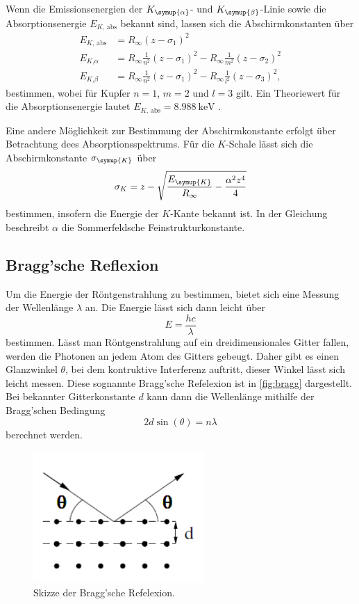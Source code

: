 Wenn die Emissionsenergien der $K_{\symup{\alpha}}$- und $K_{\symup{\beta}}$-Linie sowie die Absorptionsenergie
$E_{K\text{, abs}}$ bekannt sind, lassen sich die Abschirmkonstanten über
\begin{align}
    \label{eq:Sigma_Kupfer}
    E_{K \text{, abs}} &= R_\infty (z - \sigma_1)^2 \\
    \label{eq:Sigma_Kupfer2}
    E_{K \text{,} \alpha} &= R_\infty \frac{1}{n^2} (z - \sigma_1)^2 - R_\infty \frac{1}{m^2} (z - \sigma_2)^2 \\
    \label{eq:Sigma_Kupfer3}
    E_{K \text{,} \beta} &= R_\infty \frac{1}{n^2} (z - \sigma_1)^2 - R_\infty \frac{1}{l^2} (z - \sigma_3)^2, 
\end{align}
bestimmen, wobei für Kupfer $n = 1$, $m = 2$ und $l = 3$ gilt.
Ein Theoriewert für die Absorptionsenergie lautet $E_{K\text{, abs}}=\qty{8,988}{\kilo\electronvolt}$ \cite{Ekabs}.

Eine andere Möglichkeit zur Bestimmung der Abschirmkonstante erfolgt über Betrachtung dees Absorptionsspektrums.
Für die $K$-Schale lässt sich die Abschirmkonstante $\sigma_{\symup{K}}$ über
\begin{equation}
    \label{eq:sigma_K}
    \sigma_{K} = z - \sqrt{\frac{E_{\symup{K}}}{R_\infty} - \frac{\alpha^2 z^4}{4}}
\end{equation}
bestimmen, insofern die Energie der $K$-Kante bekannt ist.
In der Gleichung beschreibt $\alpha$ die Sommerfeldsche Feinstrukturkonstante.

\subsection{Bragg'sche Reflexion}
\label{sec:Bragg'sche Reflexion}

Um die Energie der Röntgenstrahlung zu bestimmen, bietet sich eine Messung der Wellenlänge $\lambda$ an.
Die Energie lässt sich dann leicht über
\begin{equation}
    \label{eq:Energie}
    E=\frac{hc}{\lambda}
\end{equation}
bestimmen.
Lässt man Röntgenstrahlung auf ein dreidimensionales Gitter fallen, werden die Photonen an jedem Atom des Gitters gebeugt.
Daher gibt es einen Glanzwinkel $\theta$, bei dem kontruktive Interferenz auftritt, dieser Winkel lässt sich leicht messen.
Diese sognannte Bragg'sche Refelexion ist in \autoref{fig:bragg} dargestellt.
Bei bekannter Gitterkonstante $d$ kann dann die Wellenlänge mithilfe der Bragg'schen Bedingung
\begin{equation}
    \label{eq:Bragg}
    2d\sin(\theta)=n\lambda
\end{equation}
berechnet werden.

\begin{figure}[H]
    \centering
    \includegraphics[height=5cm]{content/pics/bragg.pdf}
    \caption{Skizze der Bragg'sche Refelexion.\cite{v602}}
    \label{fig:bragg}
\end{figure}
